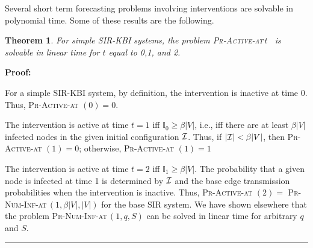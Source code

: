 \documentclass[11pt]{article}
\newtheorem{theorem}{Theorem}[section]
\newcommand{\cali}{\mbox{${\cal I}$}}
\newcommand{\QED}{\hfill\rule{2mm}{2mm}\medskip}
\newcommand{\istate}{\mbox{$\mathbb{I}$}}
\newcommand{\OneNewInfs}{\mbox{\textsc{Pr-Num-Inf-at}$\,(1, q, S)$}}
\newcommand{\tActiveAt}{\mbox{\textsc{Pr-Active-at}$\,t$}}
\begin{document}
Several short term forecasting problems involving interventions are solvable in polynomial time. 
Some of these results are the following.

\begin{theorem}\label{thm:gen_easiness}
For simple SIR-KBI systems, the problem \tActiveAt~ is solvable in linear time for $t$ equal to 0,1, and 2.
\end{theorem}
\noindent
\textbf{Proof:}~ 

For a simple SIR-KBI system, by definition, the intervention is inactive at time 0.
Thus, \textsc{Pr-Active-at} $(0) = 0$.

The intervention is active at time $t=1$ iff $\istate_0 \geq \beta |V|$, i.e.,
iff there are at least $\beta |V|$ infected nodes in the given initial configuration \cali{}.
Thus, if $| \cali | < \beta |V|$, then \textsc{Pr-Active-at} $(1) = 0$;
otherwise, \textsc{Pr-Active-at} $(1) = 1$

The intervention is active at time $t=2$ iff $\istate_1 \geq \beta |V|$.
The probability that a given node is infected  at time 1 is determined by \cali{} 
and the base edge transmission probabilities when the intervention is inactive.
Thus,  \textsc{Pr-Active-at} $(2) =$ \textsc{Pr-Num-Inf-at}$\,(1, \beta |V|, |V|)$ for the base SIR system.
We have shown elsewhere that the problem \OneNewInfs{} can be solved in linear time for
arbitrary $q$ and $S$.


\QED
\end{document}
